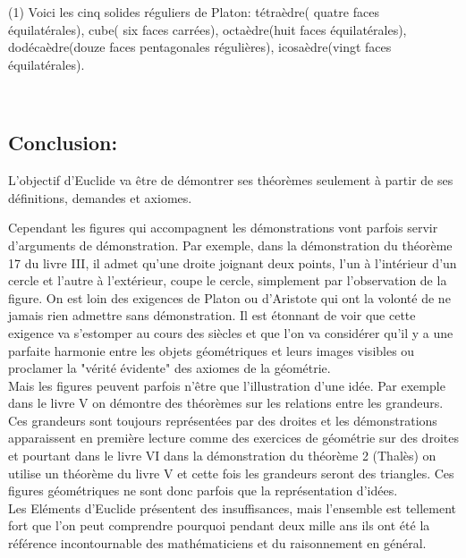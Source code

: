 \documentclass[a4paper, 12pt, twoside]{book}
\begin{document}
   \begin{footnotesize}
   (1) Voici les cinq solides réguliers de Platon: tétraèdre( quatre faces équilatérales), cube( six faces carrées), octaèdre(huit faces équilatérales), dodécaèdre(douze faces pentagonales régulières), icosaèdre(vingt faces équilatérales).
   \end{footnotesize}\\

\newpage \subsection{Conclusion:}

L'objectif d'Euclide va être de démontrer ses théorèmes seulement à partir de ses définitions, demandes et axiomes. \

Cependant les figures qui accompagnent les démonstrations vont parfois servir d'arguments de démonstration. Par exemple, dans la démonstration du théorème 17 du livre III, il admet qu'une droite joignant deux points, l'un à l'intérieur d'un cercle et l'autre à l'extérieur, coupe le cercle, simplement par l'observation de la figure. On est loin des exigences de Platon ou d'Aristote qui ont la volonté de ne jamais rien admettre sans démonstration. 
   Il est étonnant de voir que cette exigence va s'estomper au cours des siècles et que l'on va considérer qu'il y a une parfaite harmonie entre  les objets géométriques et leurs images visibles  ou  proclamer la "vérité évidente" des axiomes de la géométrie. \\
   
  
   
 
 Mais les figures peuvent parfois n'être que l'illustration d'une idée. Par exemple dans le livre V on démontre des théorèmes sur les relations entre les grandeurs. Ces grandeurs sont toujours représentées par des droites et les démonstrations apparaissent en première lecture comme des exercices de géométrie sur des droites et pourtant dans le livre VI dans la démonstration du théorème 2 (Thalès) on utilise un théorème du livre V et cette fois les grandeurs seront des triangles. Ces figures géométriques ne sont donc parfois que la représentation d'idées.\\
   
   Les Eléments d'Euclide présentent des insuffisances, mais l'ensemble est tellement fort que l'on peut comprendre pourquoi pendant deux mille ans ils ont été la référence incontournable des mathématiciens et du raisonnement en général.\
   
\end{document}
